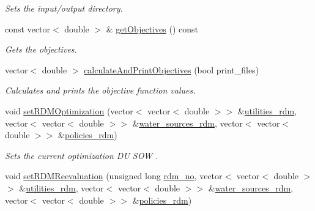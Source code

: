 \begin{DoxyCompactItemize}
\begin{DoxyCompactList}\small\item\em Sets the input/output directory. \end{DoxyCompactList}\item 
const vector$<$ double $>$ \& \mbox{\hyperlink{classProblem_aa10a0c69bf0a3d6a303c118c6fdfd5c6_aa10a0c69bf0a3d6a303c118c6fdfd5c6}{get\+Objectives}} () const
\begin{DoxyCompactList}\small\item\em Gets the objectives. \end{DoxyCompactList}\item 
vector$<$ double $>$ \mbox{\hyperlink{classProblem_ad4e2da403a38f3ee5d4de19ffdfbd148_ad4e2da403a38f3ee5d4de19ffdfbd148}{calculate\+And\+Print\+Objectives}} (bool print\+\_\+files)
\begin{DoxyCompactList}\small\item\em Calculates and prints the objective function values. \end{DoxyCompactList}\item 
void \mbox{\hyperlink{classProblem_a08d3f34a593cb07851d1c3f3ad9d5160_a08d3f34a593cb07851d1c3f3ad9d5160}{set\+R\+D\+M\+Optimization}} (vector$<$ vector$<$ double $>$$>$ \&\mbox{\hyperlink{classProblem_aa4f6db22580c8d8a941e83556f4f5208_aa4f6db22580c8d8a941e83556f4f5208}{utilities\+\_\+rdm}}, vector$<$ vector$<$ double $>$$>$ \&\mbox{\hyperlink{classProblem_ace43e5306285f0d91a199a4bd5a38922_ace43e5306285f0d91a199a4bd5a38922}{water\+\_\+sources\+\_\+rdm}}, vector$<$ vector$<$ double $>$$>$ \&\mbox{\hyperlink{classProblem_a63d49161a5d6d98e26cd218d90a13bae_a63d49161a5d6d98e26cd218d90a13bae}{policies\+\_\+rdm}})
\begin{DoxyCompactList}\small\item\em Sets the current optimization DU S\+OW . \end{DoxyCompactList}\item 
void \mbox{\hyperlink{classProblem_ad12f4546fc341e396ef9d4a6608e6d41_ad12f4546fc341e396ef9d4a6608e6d41}{set\+R\+D\+M\+Reevaluation}} (unsigned long \mbox{\hyperlink{classProblem_a9e780729b6be5229c5bfa1e38c99cfa5_a9e780729b6be5229c5bfa1e38c99cfa5}{rdm\+\_\+no}}, vector$<$ vector$<$ double $>$$>$ \&\mbox{\hyperlink{classProblem_aa4f6db22580c8d8a941e83556f4f5208_aa4f6db22580c8d8a941e83556f4f5208}{utilities\+\_\+rdm}}, vector$<$ vector$<$ double $>$$>$ \&\mbox{\hyperlink{classProblem_ace43e5306285f0d91a199a4bd5a38922_ace43e5306285f0d91a199a4bd5a38922}{water\+\_\+sources\+\_\+rdm}}, vector$<$ vector$<$ double $>$$>$ \&\mbox{\hyperlink{classProblem_a63d49161a5d6d98e26cd218d90a13bae_a63d49161a5d6d98e26cd218d90a13bae}{policies\+\_\+rdm}})

\end{DoxyCompactItemize}
